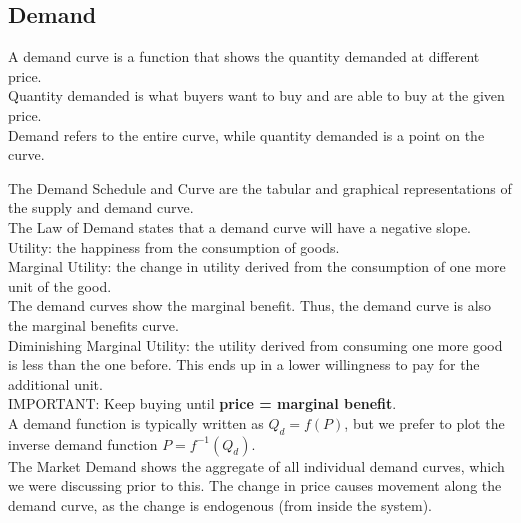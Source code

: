 \documentclass[nobib]{tufte-handout}
\begin{document}
\subsection{Demand}
A demand curve is a function that shows the quantity demanded at different
price.\\ Quantity demanded is what buyers want to buy and are able to buy at
the given price.\\ Demand refers to the entire curve, while quantity demanded
is a point on the curve.\\
\begin{center}
\end{center}
The Demand Schedule and Curve are the tabular and graphical representations of the supply and demand curve.\\
The Law of Demand states that a demand curve will have a negative slope.\\
Utility: the happiness from the consumption of goods.\\
Marginal Utility: the change in utility derived from the consumption of one more unit of the good.\\
The demand curves show the marginal benefit. Thus, the demand curve is also the marginal benefits curve.\\
Diminishing Marginal Utility: the utility derived from consuming one more good is less than the one before. This ends up in a lower willingness to pay for the additional unit.\\
IMPORTANT: Keep buying until \textbf{price = marginal benefit}.\\
A demand function is typically written as $Q_d=f(P)$, but we prefer to plot the inverse demand function $P = f^{-1}(Q_d)$.\\
The Market Demand shows the aggregate of all individual demand curves, which we were discussing prior to this.
The change in price causes movement along the demand curve, as the change is endogenous (from inside the system).\\
\end{document}
